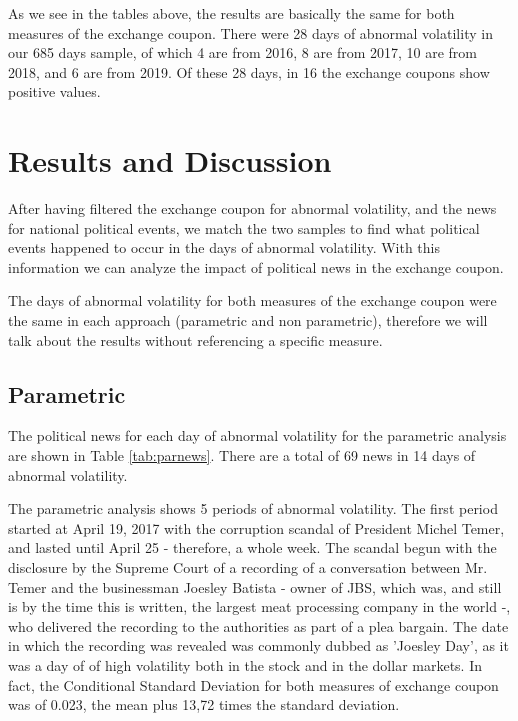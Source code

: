 \documentclass[cic,tc, english]{iiufrgs}
\begin{document}
    

    

    As we see in the tables above, the results are basically the same for both measures of the exchange coupon. There were 28 days of abnormal volatility in our 685 days sample, of which 4 are from 2016, 8 are from 2017, 10 are from 2018, and 6 are from 2019. Of these 28 days, in 16 the exchange coupons show positive values.

\chapter{Results and Discussion} \label{chapter_results_discussion}

    After having filtered the exchange coupon for abnormal volatility, and the news for national political events, we match the two samples to find what political events happened to occur in the days of abnormal volatility. With this information we can analyze the impact of political news in the exchange coupon.

    The days of abnormal volatility for both measures of the exchange coupon were the same in each approach (parametric and non parametric), therefore we will talk about the results without referencing a specific measure.

\section{Parametric}

    The political news for each day of abnormal volatility for the parametric analysis are shown in Table \ref{tab:parnews}. There are a total of 69 news in 14 days of abnormal volatility.

    

    The parametric analysis shows 5 periods of abnormal volatility. The first period started at April 19, 2017 with the corruption scandal of President Michel Temer, and lasted until April 25 - therefore, a whole week. The scandal begun with the disclosure by the Supreme Court of a recording of a conversation between Mr. Temer and the businessman Joesley Batista - owner of JBS, which was, and still is by the time this is written, the largest meat processing company in the world -, who delivered the recording to the authorities as part of a plea bargain. The date in which the recording was revealed was commonly dubbed as 'Joesley Day', as it was a day of of high volatility both in the stock and in the dollar markets. In fact, the Conditional Standard Deviation for both measures of exchange coupon was of 0.023, the mean plus 13,72 times the standard deviation.
\end{document}
